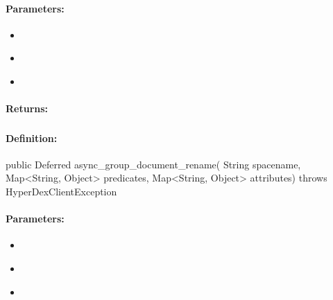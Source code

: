 \paragraph{Parameters:}
\begin{itemize}[noitemsep]
\item {}\\

\item {}\\

\item {}\\

\end{itemize}

\paragraph{Returns:}


\pagebreak
\subsubsection{}
\label{api:java:async_group_document_rename}


\paragraph{Definition:}
\begin{javacode}
public Deferred async_group_document_rename(
        String spacename,
        Map<String, Object> predicates,
        Map<String, Object> attributes) throws HyperDexClientException
\end{javacode}

\paragraph{Parameters:}
\begin{itemize}[noitemsep]
\item {}\\

\item {}\\

\item {}\\

\end{itemize}

